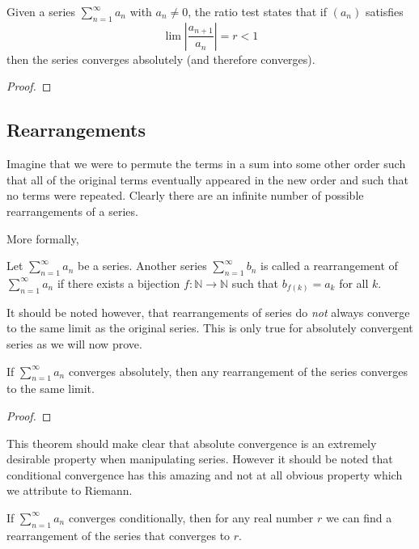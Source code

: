 	\begin{theorem}
	Given a series $\sum_{n=1}^{\infty} a_n$ with $a_n \neq 0$, the ratio test states that if $(a_n)$ satisfies 
	\[		\lim \left|\frac{a_{n+1}}{a_n}	\right| = r < 1\]
	then the series converges absolutely (and therefore converges).
	\end{theorem} 
	\begin{proof}  \end{proof}
	
	
	\subsection{Rearrangements}
		Imagine that we were to permute the terms in a sum into some other order such that all of the original terms eventually appeared in the new order and such that no terms were repeated.  Clearly there are an infinite number of possible rearrangements of a series.  
		
		More formally,
		
		  Let  $\sum_{n=1}^{\infty} a_n$ be a series.  Another series  $\sum_{n=1}^{\infty} b_n$ is called a rearrangement of  $\sum_{n=1}^{\infty} a_n$ if there exists a bijection $f: \mathbb{N} \to \mathbb{N}$ such that $b_{f(k)} = a_{k}$ for all $k$.
		
		It should be noted however, that rearrangements of series do \emph{not} always converge to the same limit as the original series.  This is only true for absolutely convergent series as we will now prove.
		
		
		\begin{theorem}
	If $\sum_{n=1}^{\infty} a_n$ converges absolutely, then any rearrangement of the series converges to the same limit.
	\end{theorem} 
	\begin{proof}  \end{proof}
	
	This theorem should make clear that absolute convergence is an extremely desirable property when manipulating series.  However it should be noted that conditional convergence has this amazing and not at all obvious property which we attribute to Riemann.
	
	
	\begin{theorem}
	If $\sum_{n=1}^{\infty} a_n$ converges conditionally, then for any real number $r$ we can find a rearrangement of the series that converges to $r$.
	\end{theorem} 
		
